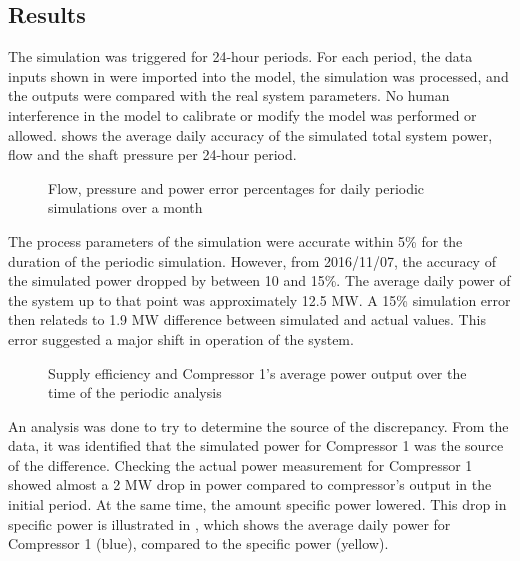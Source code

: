 \subsection{Results}

 The simulation was triggered for 24-hour periods. For each period, the data inputs shown in  were imported into the model, the simulation was processed, and the outputs were compared with the real system parameters. No human interference in the model to calibrate or modify the model was performed or allowed.  shows the average daily accuracy of the simulated total system power, flow and the shaft pressure per 24-hour period.
	 \par 
 
	\begin{figure}[h!]
		\centering
		
		\caption{Flow, pressure and power error percentages for daily periodic simulations over a month}
		\label{fig: Periodic simulation}
	\end{figure} 
The process parameters of the simulation were accurate within 5\% for the duration of the periodic simulation. However, from 2016/11/07, the accuracy of the simulated power dropped by between 10 and 15\%. The average daily power of the system up to that point was approximately 12.5 MW. A 15\% simulation error then relateds to 1.9 MW difference between simulated and actual values. This error suggested a major shift in operation of the system.
\par 
\begin{figure}[h!]
	\centering
	
	\caption{Supply efficiency and Compressor 1's average power output over the time of the periodic analysis}
	\label{fig: MeasurementAccuracy.}
\end{figure} 

An analysis was done to try to determine the source of the discrepancy. From the data, it was identified that the simulated power for Compressor 1 was the source of the difference. Checking the actual power measurement for Compressor 1 showed almost a 2 MW drop in power compared to compressor's output in the initial period. At the same time, the amount specific power lowered. This drop in specific power is illustrated in , which shows the average daily power for Compressor 1 (blue), compared to the specific power (yellow). 
\par
	
